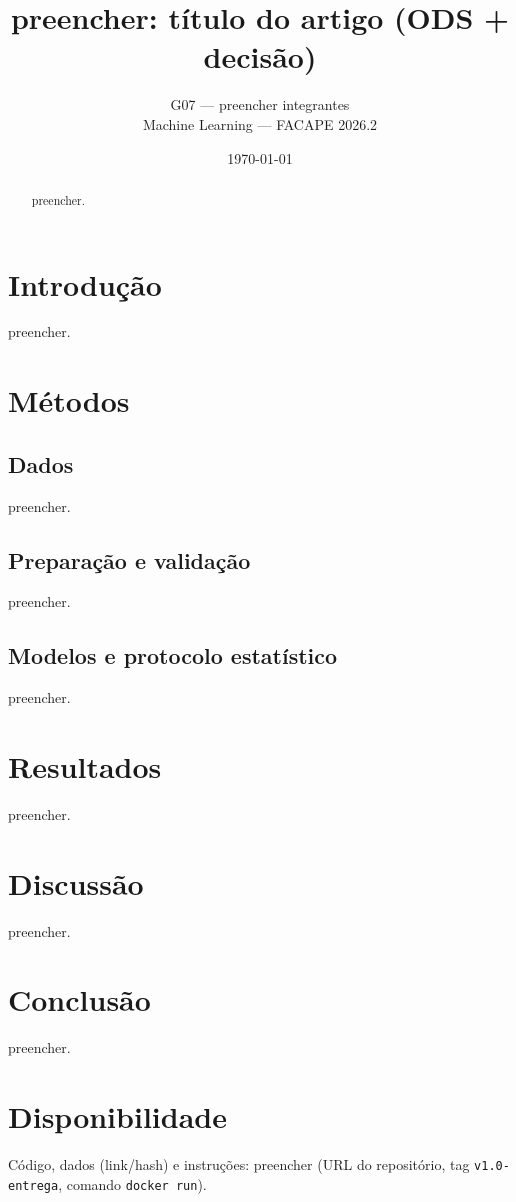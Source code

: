 \documentclass[11pt,a4paper]{article}
\title{preencher: título do artigo (ODS + decisão)}
\author{G07 --- preencher integrantes \\ Machine Learning --- FACAPE 2026.2}
\date{\today}
\begin{document}
\maketitle

\begin{abstract}
preencher.
\end{abstract}

\section{Introdução}
preencher.

\section{Métodos}
\subsection{Dados}
preencher.

\subsection{Preparação e validação}
preencher.

\subsection{Modelos e protocolo estatístico}
preencher.

\section{Resultados}
% 
preencher.

\section{Discussão}
preencher.

\section{Conclusão}
preencher.

\section*{Disponibilidade}
Código, dados (link/hash) e instruções: preencher (URL do repositório, tag
\texttt{v1.0-entrega}, comando \texttt{docker run}).



\end{document}
